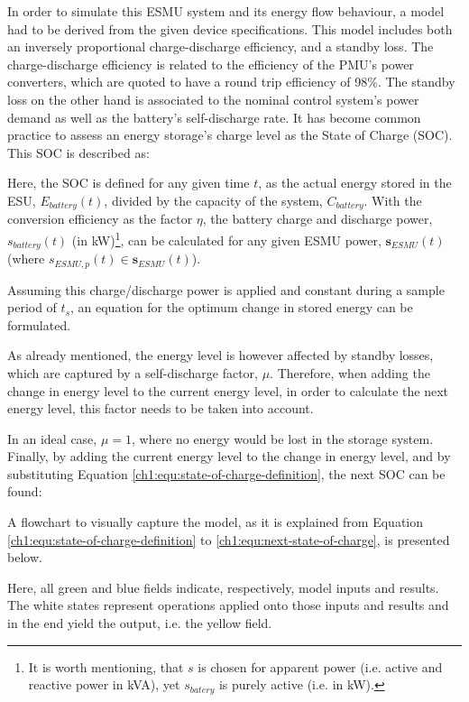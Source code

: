In order to simulate this ESMU system and its energy flow behaviour, a model had to be derived from the given device specifications.
This model includes both an inversely proportional charge-discharge efficiency, and a standby loss.
The charge-discharge efficiency is related to the efficiency of the PMU's power converters, which are quoted to have a round trip efficiency of 98\%.
The standby loss on the other hand is associated to the nominal control system's power demand as well as the battery's self-discharge rate.
It has become common practice to assess an energy storage's charge level as the State of Charge (SOC).
This SOC is described as:



Here, the SOC is defined for any given time $t$, as the actual energy stored in the ESU, $E_{battery}(t)$, divided by the capacity of the system, $C_{battery}$.
With the conversion efficiency as the factor $\eta$, the battery charge and discharge power, $s_{battery}(t)$ (in kW)\footnote[1]{It is worth mentioning, that $s$ is chosen for apparent power (i.e. active and reactive power in kVA), yet $s_{batery}$ is purely active (i.e. in kW).}, can be calculated for any given ESMU power, $\textbf{s}_{ESMU}(t)$ (where $s_{ESMU,p}(t) \in \textbf{s}_{ESMU}(t)$).



Assuming this charge/discharge power is applied and constant during a sample period of $t_s$, an equation for the optimum change in stored energy can be formulated.



As already mentioned, the energy level is however affected by standby losses, which are captured by a self-discharge factor, $\mu$.
Therefore, when adding the change in energy level to the current energy level, in order to calculate the next energy level, this factor needs to be taken into account.



In an ideal case, $\mu = 1$, where no energy would be lost in the storage system.
Finally, by adding the current energy level to the change in energy level, and by substituting Equation \ref{ch1:equ:state-of-charge-definition}, the next SOC can be found:



A flowchart to visually capture the model, as it is explained from Equation \ref{ch1:equ:state-of-charge-definition} to \ref{ch1:equ:next-state-of-charge}, is presented below.



Here, all green and blue fields indicate, respectively, model inputs and results.
The white states represent operations applied onto those inputs and results and in the end yield the output, i.e. the yellow field.
